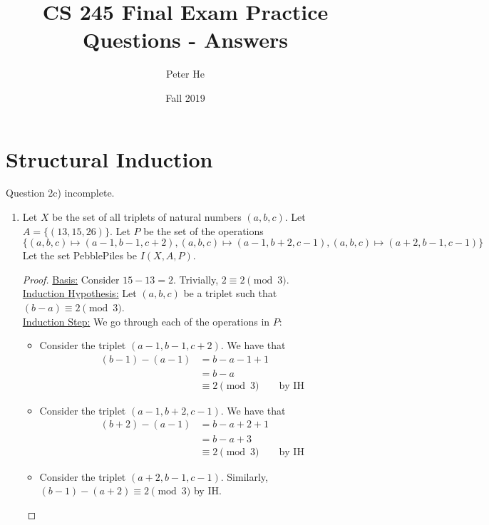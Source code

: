 \documentclass[12pt]{article}
\title{CS 245 Final Exam Practice Questions - Answers}
\author{Peter He}
\date{Fall 2019}
\begin{document}
\maketitle

\section{Structural Induction}

Question 2c) incomplete.

\begin{enumerate}
    \item 
    \begin{tasks}
        \task Let $X$ be the set of all triplets of natural numbers $(a,b,c)$. Let $A=\{(13,15,26)\}$. Let $P$ be the set of the operations \[\{(a,b,c)\mapsto (a-1,b-1,c+2),(a,b,c)\mapsto (a-1,b+2,c-1),(a,b,c)\mapsto (a+2,b-1,c-1)\}\] Let the set PebblePiles be $I(X,A,P)$.
        \task
            \begin{proof}
                \underline{Basis:} Consider $15-13=2$. Trivially, $2\equiv 2\pmod{3}$.\\
                \underline{Induction Hypothesis:} Let $(a,b,c)$ be a triplet such that $(b-a)\equiv 2\pmod{3}$.\\
                \underline{Induction Step:} We go through each of the operations in $P$:
                \begin{itemize}
                    \item Consider the triplet $(a-1,b-1,c+2)$. We have that
                    \begin{align*}
                        (b-1)-(a-1)&=b-a-1+1\\
                        &=b-a\\
                        &\equiv 2\pmod{3}\qquad\text{by IH}
                    \end{align*}
                    \item Consider the triplet $(a-1,b+2,c-1)$. We have that
                    \begin{align*}
                        (b+2)-(a-1)&=b-a+2+1\\
                        &=b-a+3\\
                        &\equiv 2\pmod{3}\qquad\text{by IH}
                    \end{align*}
                    \item Consider the triplet $(a+2,b-1,c-1)$. Similarly, $(b-1)-(a+2)\equiv 2\pmod{3}$ by IH.
                \end{itemize}

\end{proof}
\end{tasks}
\end{enumerate}
\end{document}
